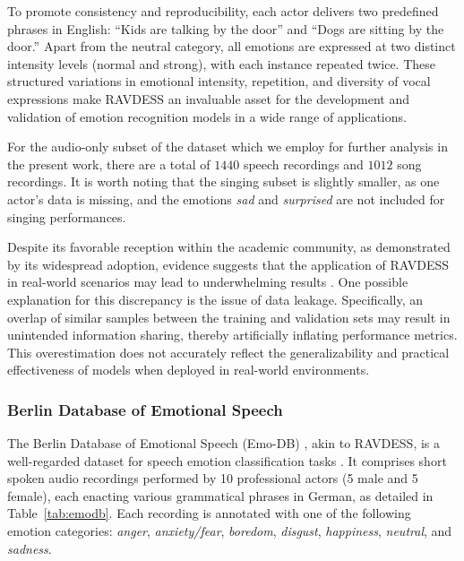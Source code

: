 To promote consistency and reproducibility, each actor delivers two predefined phrases in English: ``Kids are talking by the door'' and ``Dogs are sitting by the door.'' Apart from the neutral category, all emotions are expressed at two distinct intensity levels (normal and strong), with each instance repeated twice. These structured variations in emotional intensity, repetition, and diversity of vocal expressions make RAVDESS an invaluable asset for the development and validation of emotion recognition models in a wide range of applications.

For the audio-only subset of the dataset which we employ for further analysis in the present work, there are a total of $1440$ speech recordings and $1012$ song recordings. It is worth noting that the singing subset is slightly smaller, as one actor's data is missing, and the emotions \textit{sad} and \textit{surprised} are not included for singing performances.

Despite its favorable reception within the academic community, as demonstrated by its widespread adoption, evidence suggests that the application of RAVDESS in real-world scenarios may lead to underwhelming results \cite{churaev2021}. One possible explanation for this discrepancy is the issue of data leakage. Specifically, an overlap of similar samples between the training and validation sets may result in unintended information sharing, thereby artificially inflating performance metrics. This overestimation does not accurately reflect the generalizability and practical effectiveness of models when deployed in real-world environments.

\subsubsection{Berlin Database of Emotional Speech} %

The Berlin Database of Emotional Speech (Emo-DB) \cite{emodb}, akin to RAVDESS, is a well-regarded dataset for speech emotion classification tasks \cite{sinith2015, kotti2008, ying2010}. It comprises short spoken audio recordings performed by 10 professional actors (5 male and 5 female), each enacting various grammatical phrases in German, as detailed in Table~\ref{tab:emodb}. Each recording is annotated with one of the following emotion categories: \textit{anger}, \textit{anxiety/fear}, \textit{boredom}, \textit{disgust}, \textit{happiness}, \textit{neutral}, and \textit{sadness}.

